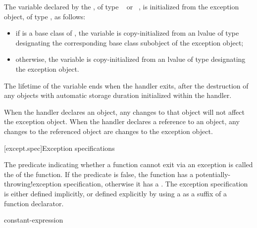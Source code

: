 \pnum
The variable declared by the , of type
\cv{}~ or \cv{}~, is initialized from the exception object,
of type , as follows:
\begin{itemize}
\item
if  is a base class of ,
the variable is copy-initialized
from an lvalue of type  designating the corresponding base class subobject
of the exception object;
\item otherwise, the variable is copy-initialized
from an lvalue of type  designating the exception object.
\end{itemize}

The lifetime of the variable ends
when the handler exits, after the
destruction of any objects with automatic storage duration initialized
within the handler.

\pnum
\begin{note}
When the handler declares an object,
any changes to that object will not affect the exception object.
When the handler declares a reference to an object,
any changes to the referenced object are changes to the
exception object.
\end{note}
%
%

[except.spec]{Exception specifications}%

\pnum
The predicate indicating whether a function cannot exit via an exception
is called the  of the function.
If the predicate is false,
the function has a
%
%
{potentially-throwing!exception specification},
otherwise it has a
%
.
The exception specification is either defined implicitly,
or defined explicitly
by using a 
as a suffix of a function declarator.

\begin{bnf}
\br
     \terminal{(} constant-expression \terminal{)}\br
\end{bnf}

